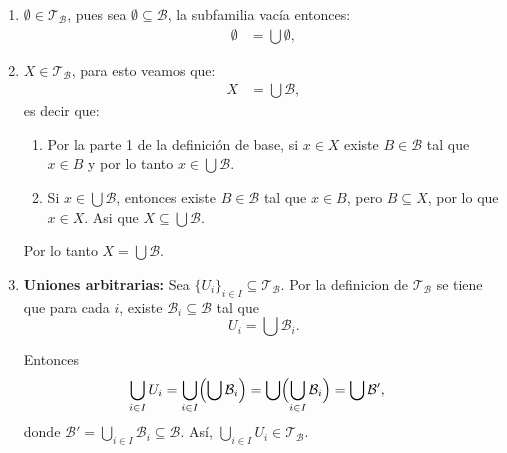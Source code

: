 \begin{enumerate}[label=\arabic*.]
  \item $\emptyset \in  \mathcal T_{\mathcal{B}}$, pues sea $\emptyset \subseteq \mathcal{B}$, la subfamilia vacía entonces:
    \begin{align*}
      \emptyset &= \bigcup \emptyset,
    \end{align*}

  \item $X\in\mathcal T_{\mathcal{B}}$, para esto veamos que:
    \begin{align*}
      X &= \bigcup \mathcal{B},
    \end{align*}
    es decir que:
    \begin{enumerate}[label=\alph*)]
        \item[$\supseteq$] Por la parte 1 de la definición de base, si $x\in X$ existe $B\in\mathcal{B}$ tal que $x\in B$ y por lo tanto $x\in \bigcup \mathcal{B}$.
        \item[$\subseteq$] Si $x\in \bigcup \mathcal{B}$, entonces existe $B\in\mathcal{B}$ tal que $x\in B$, pero $B\subseteq X$, por lo que $x\in X$. Asi que $X\subseteq \bigcup \mathcal{B}$.
    \end{enumerate}
    Por lo tanto $X=\bigcup \mathcal{B}$.

  \item \textbf{Uniones arbitrarias:} Sea $\{U_i\}_{i\in I}\subseteq \mathcal T_{\mathcal{B}}$. Por la definicion de $\mathcal T_{\mathcal B}$ se tiene que para cada $i$, existe $\mathcal{B}_i\subseteq\mathcal{B}$ tal que
    \[
      U_i = \bigcup \mathcal{B}_i.
    \]

    Entonces
    \begin{align*}
      \bigcup_{i\in I} U_i
      &= \bigcup_{i\in I}\Bigl(\bigcup \mathcal{B}_i\Bigr)
      = \bigcup\Bigl(\bigcup_{i\in I}\mathcal{B}_i\Bigr)
      = \bigcup \mathcal{B}', 
    \end{align*}
    donde $\mathcal{B}'=\bigcup_{i\in I}\mathcal{B}_i\subseteq\mathcal{B}$. Así, $\bigcup_{i\in I}U_i\in\mathcal T_{\mathcal{B}}$.


\end{enumerate}
